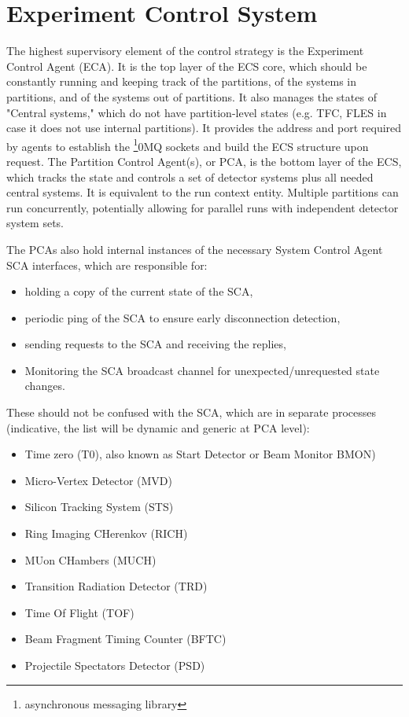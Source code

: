 \section{Experiment Control System}\label{sssAgents}

The highest supervisory element of the control strategy is the Experiment Control Agent 
(\gls{ECA}). It is the top layer of the \gls{ECS} core, which should be constantly running and keeping track of the partitions, of the systems in partitions, and of the systems out of partitions. It also manages the states of "Central systems," which do not have partition-level states (e.g. \gls{TFC}, \gls{FLES} in case it does not use internal partitions).  It provides the address and port required by agents to establish the \footnote{asynchronous messaging library}{0MQ} sockets and build the \gls{ECS} structure upon request. The Partition Control Agent(s), or \gls{PCA}, is the bottom layer of the \gls{ECS}, which tracks the state and controls a set of detector systems plus all needed central systems.  It is equivalent to the run context entity. Multiple partitions can run concurrently, potentially allowing for parallel runs with independent detector system sets. 

The \glspl{PCA} also hold internal instances of the necessary System Control Agent \gls{SCA} interfaces, which are responsible for:
\begin{itemize}
 \item holding a copy of the current state of the \gls{SCA},
 \item periodic ping of the \gls{SCA} to ensure early disconnection detection,
 \item sending requests to the \gls{SCA} and receiving the replies,
 \item Monitoring the \gls{SCA} broadcast channel for unexpected/unrequested state changes.
\end{itemize}
These should not be confused with the \gls{SCA}, which are in separate processes (indicative, the list will be dynamic and generic at \gls{PCA} level):

\begin{itemize}
 \item Time zero (T0), also known as Start Detector or Beam Monitor \gls{BMON})
 \item Micro-Vertex Detector (\gls{MVD})
 \item Silicon Tracking System (\gls{STS})
 \item Ring Imaging CHerenkov (\gls{RICH})
 \item MUon CHambers (\gls{MUCH})
 \item Transition Radiation Detector (\gls{TRD})
 \item Time Of Flight (\gls{TOF})
 \item Beam Fragment Timing Counter (\gls{BFTC})
 \item Projectile Spectators Detector (\gls{PSD})
\end{itemize}

